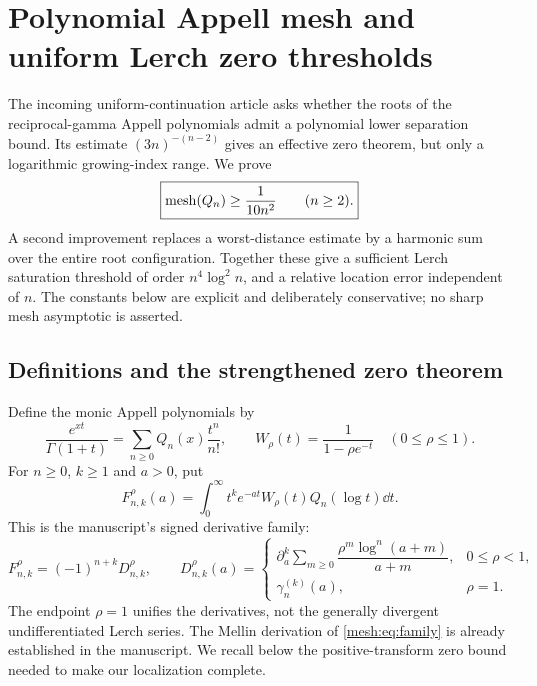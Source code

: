 \section{Polynomial Appell mesh and uniform Lerch zero thresholds}
\label{mesh:sec:main}

The incoming uniform-continuation article asks whether the roots of the
reciprocal-gamma Appell polynomials admit a polynomial lower separation
bound. Its estimate $(3n)^{-(n-2)}$ gives an effective zero theorem, but
only a logarithmic growing-index range. We prove
\begin{equation}\label{mesh:eq:main-mesh}
 \boxed{\operatorname{mesh}(Q_n)\geq\frac1{10n^2}\qquad(n\geq2).}
\end{equation}
A second improvement replaces a worst-distance estimate by a harmonic
sum over the entire root configuration. Together these give a sufficient
Lerch saturation threshold of order $n^4\log^2 n$, and a relative
location error independent of $n$. The constants below are explicit
and deliberately conservative; no sharp mesh asymptotic is asserted.

\subsection{Definitions and the strengthened zero theorem}

Define the monic Appell polynomials by
\begin{equation}\label{mesh:eq:Q}
 \frac{e^{xt}}{\Gamma(1+t)}
   =\sum_{n\geq0}Q_n(x)\frac{t^n}{n!},
 \qquad W_\rho(t)=\frac1{1-\rho e^{-t}}\quad(0\leq\rho\leq1).
\end{equation}
For $n\geq0$, $k\geq1$ and $a>0$, put
\begin{equation}\label{mesh:eq:family}
 F_{n,k}^\rho(a)=\int_0^\infty
      t^k e^{-at}W_\rho(t)Q_n(\log t)\dd t.
\end{equation}
This is the manuscript's signed derivative family:
\[
 F_{n,k}^\rho=(-1)^{n+k}D_{n,k}^\rho,
 \qquad
 D_{n,k}^\rho(a)=
 \begin{cases}
  \partial_a^k\displaystyle\sum_{m\geq0}
       \dfrac{\rho^m\log^n(a+m)}{a+m},&0\leq\rho<1,\\[2mm]
  \gamma_n^{(k)}(a),&\rho=1.
 \end{cases}
\]
The endpoint $\rho=1$ unifies the derivatives, not the generally
divergent undifferentiated Lerch series. The Mellin derivation of
\eqref{mesh:eq:family} is already established in the manuscript.
We recall below the positive-transform zero bound needed to make
our localization complete.

